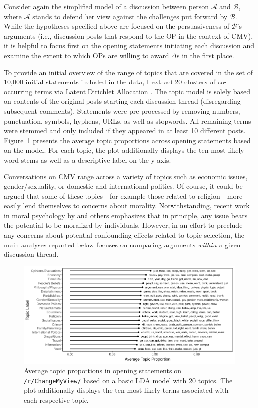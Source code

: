 Consider again the simplified model of a discussion between person $\mathcal{A}$ and $\mathcal{B}$, where $\mathcal{A}$ stands to defend her view against the challenges put forward by $\mathcal{B}$. While the hypotheses specified above are focused on the persuasiveness of $\mathcal{B}$'s arguments (i.e., discussion posts that respond to the OP in the context of CMV), it is helpful to focus first on the opening statements initiating each discussion and examine the extent to which OPs are willing to award $\Delta$s in the first place.

To provide an initial overview of the range of topics that are covered in the set of 10,000 initial statements included in the data, I extract 20 clusters of co-occurring terms via Latent Dirichlet Allocation \citep{blei2003latent}. The topic model is solely based on contents of the original posts starting each discussion thread (disregarding subsequent comments). Statements were pre-processed by removing numbers, punctuation, symbols, hyphens, URLs, as well as stopwords. All remaining terms were stemmed and only included if they appeared in at least 10 different posts. Figure~\ref{fig:lda} presents the average topic proportions across opening statements based on the model. For each topic, the plot additionally displays the ten most likely word stems as well as a descriptive label on the y-axis.

Conversations on CMV range across a variety of topics such as economic issues, gender/sexuality, or domestic and international politics. Of course, it could be argued that some of these topics---for example those related to religion---more easily lend themselves to concerns about morality. Notwithstanding, recent work in moral psychology by \citet{ryan2014reconsidering} and others emphasizes that in principle, any issue bears the potential to be moralized by individuals. However, in an effort to preclude any concerns about potential confounding effects related to topic selection, the main analyses reported below focuses on comparing arguments \textit{within} a given discussion thread.

\begin{figure}[ht]
\centering
\includegraphics{fig1-topics.png}
\caption[Average topic proportions in opening statements on \texttt{/r/ChangeMyView/}]{Average topic proportions in opening statements on \texttt{/r/ChangeMyView/} based on a basic LDA model with 20 topics. The plot additionally displays the ten most likely terms associated with each respective topic.}\label{fig:lda}
\end{figure}

